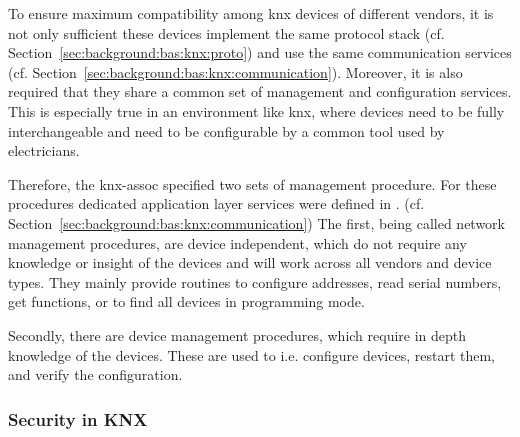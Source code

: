 To ensure maximum compatibility among \gls{knx} devices of different vendors, it is not only sufficient these devices implement the same protocol stack (cf. Section~\ref{sec:background:bas:knx:proto}) and use the same communication services (cf. Section~\ref{sec:background:bas:knx:communication}).
Moreover, it is also required that they share a common set of management and configuration services.
This is especially true in an environment like \gls{knx}, where devices need to be fully interchangeable and need to be configurable by a common tool used by electricians.

Therefore, the \gls{knx-assoc} specified two sets of management procedure.
For these procedures dedicated application layer services were defined in \textcite{DIN_EN_50090-4-1}. (cf. Section~\ref{sec:background:bas:knx:communication})
The first, being called network management procedures, are device independent, which do not require any knowledge or insight of the devices and will work across all vendors and device types. \parencite[pp.~11~ff.]{DIN_EN_50090-7-1}
They mainly provide routines to configure addresses, read serial numbers, get functions, or to find all devices in programming mode.

Secondly, there are device management procedures, which require in depth knowledge of the devices. \parencite[pp.~30~ff.]{DIN_EN_50090-7-1}
These are used to i.e. configure devices, restart them, and verify the configuration.

\subsubsection{Security in KNX}
\label{sec:background:bas:knx:security}

